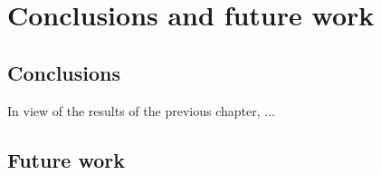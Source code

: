 \chapter{Conclusions and future work}
\label{cha:concl_en}

\section{Conclusions}
In view of the results of the previous chapter, $\ldots$

\section{Future work}


